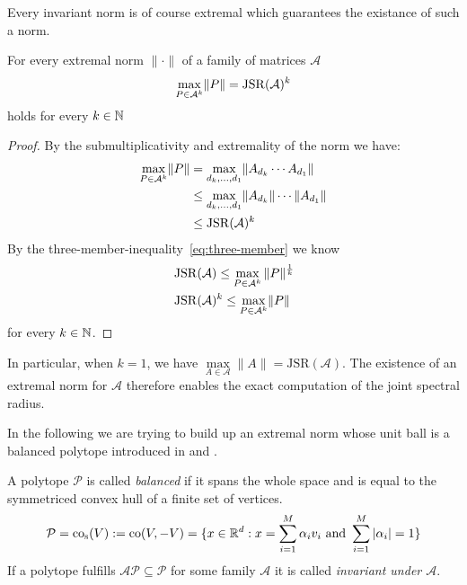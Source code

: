 Every invariant norm is of course extremal which guarantees the existance of such a norm. 
  
\begin{theorem}
    For every extremal norm $\lVert \cdot \rVert$ of a family of matrices $\mathcal{A}$ 
    $$
    \max \limits_{P \in \mathcal{A}^k} \lVert P \rVert = \operatorname{JSR}(\mathcal{A})^k
    $$
    holds for every $k \in \mathbb{N}$ 
\end{theorem}
\begin{proof}
    By the submultiplicativity and extremality of the norm we have:
    $$
    \begin{aligned}
        \max \limits_{P \in \mathcal{A}^k} \lVert P \rVert & = \max \limits_{d_k,\dots,d_1} \lVert A_{d_k}\cdots A_{d_1} \rVert \\
        & \le \max \limits_{d_k,\dots,d_1} \lVert A_{d_k} \rVert \cdots \lVert A_{d_1} \rVert \\
        & \le \operatorname{JSR}(\mathcal{A})^k 
    \end{aligned}
    $$
    By the three-member-inequality~\ref{eq:three-member} we know
    $$
    \begin{aligned}
        & \operatorname{JSR}(\mathcal{A}) \leq \max_{P \in \mathcal{A}^k} \| P\|^{\frac{1}{k}} \\
        & \operatorname{JSR}(\mathcal{A})^k \leq \max \limits_{P \in \mathcal{A}^k} \lVert P \rVert 
    \end{aligned}
    $$
    for every $k \in \mathbb{N}$.

\end{proof}

\begin{remark}
    In particular, when $k = 1$, we have $\max\limits_{A \in \mathcal{A}} \lVert A \rVert = \mathrm{JSR}(\mathcal{A})$. The existence of an extremal norm for $\mathcal{A}$ therefore enables the exact computation of the joint spectral radius.
\end{remark}

In the following we are trying to build up an extremal norm whose unit ball is a balanced polytope introduced in \citep{protasov1996joint} and \citep{guglielmi2008algorithm}.

\begin{definition}
    A polytope $\mathcal{P}$ is called \emph{balanced} if it spans the whole space and is equal to the symmetriced convex hull of a finite set of vertices.
    $$\mathcal{P} = \text{co}_{\text{s}}(V) := \text{co}(V, -V) = \{x \in \mathbb{R}^d : x = \sum_{i=1}^M \alpha_i v_i \text{ and } \sum_{i=1}^M |\alpha_i| = 1\}$$
    If a polytope fulfills $\mathcal{A}\mathcal{P} \subseteq \mathcal{P}$ for some family $\mathcal{A}$ it is called \emph{invariant under $\mathcal{A}$}.
\end{definition}



